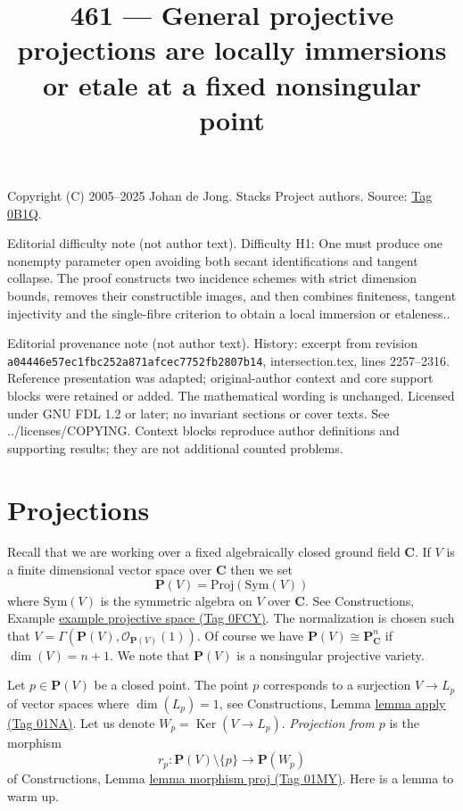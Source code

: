\documentclass{amsart}
\theoremstyle{plain}
\theoremstyle{definition}
\theoremstyle{remark}
\numberwithin{equation}{subsection}
\def\Ker{\mathop{\mathrm{Ker}}}
\begin{document}
\title[Stacks Project, Tag 0B1Q]{461 --- General projective projections are locally immersions or etale at a fixed nonsingular point}
\maketitle
\noindent Copyright (C) 2005--2025 Johan de Jong. Stacks Project authors. Source: \href{https://stacks.math.columbia.edu/tag/0B1Q}{Tag 0B1Q}.

\noindent Editorial difficulty note (not author text). Difficulty H1: One must produce one nonempty parameter open avoiding both secant identifications and tangent collapse. The proof constructs two incidence schemes with strict dimension bounds, removes their constructible images, and then combines finiteness, tangent injectivity and the single-fibre criterion to obtain a local immersion or etaleness..

\noindent Editorial provenance note (not author text). History: excerpt from revision \texttt{a0444\allowbreak 6e57e\allowbreak c1fbc\allowbreak 252a8\allowbreak 71afc\allowbreak ec775\allowbreak 2fb28\allowbreak 07b14}, intersection.tex, lines 2257--2316. Reference presentation was adapted; original-author context and core support blocks were retained or added. The mathematical wording is unchanged. Licensed under GNU FDL 1.2 or later; no invariant sections or cover texts. See ../licenses/COPYING. Context blocks reproduce author definitions and supporting results; they are not additional counted problems.

\section{Projections}
\label{section-projection}

\noindent
Recall that we are working over a fixed algebraically closed ground field
$\mathbf{C}$. If $V$ is a finite dimensional vector space over $\mathbf{C}$
then we set
$$
\mathbf{P}(V) = \text{Proj}(\text{Sym}(V))
$$
where $\text{Sym}(V)$ is the symmetric algebra on $V$ over $\mathbf{C}$.
See Constructions, Example \href{https://stacks.math.columbia.edu/tag/0FCY}{example projective space (Tag 0FCY)}.
The normalization is chosen such that
$V = \Gamma(\mathbf{P}(V), \mathcal{O}_{\mathbf{P}(V)}(1))$.
Of course we have $\mathbf{P}(V) \cong \mathbf{P}^n_{\mathbf{C}}$ if
$\dim(V) = n + 1$. We note that $\mathbf{P}(V)$ is a nonsingular projective
variety.

\medskip\noindent
Let $p \in \mathbf{P}(V)$ be a closed point. The point $p$ corresponds to a
surjection $V \to L_p$ of vector spaces where $\dim(L_p) = 1$, see
Constructions, Lemma \href{https://stacks.math.columbia.edu/tag/01NA}{lemma apply (Tag 01NA)}.
Let us denote $W_p = \Ker(V \to L_p)$.
{\it Projection from $p$} is the morphism
$$
r_p : \mathbf{P}(V) \setminus \{p\} \longrightarrow \mathbf{P}(W_p)
$$
of Constructions, Lemma \href{https://stacks.math.columbia.edu/tag/01MY}{lemma morphism proj (Tag 01MY)}.
Here is a lemma to warm up.
\end{document}
